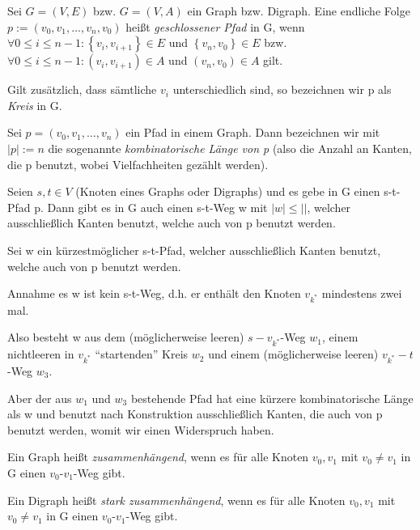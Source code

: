 \documentclass[10pt]{scrbook}
\begin{document}
\begin{Def}
Sei $G=(V, E)$ bzw. $G=(V, A)$ ein Graph bzw. Digraph. Eine endliche Folge $p:=\left(v_0, v_1, \ldots, v_n, v_0\right)$ heißt \emph{geschlossener Pfad} in G, wenn $\forall 0\leq i \leq n-1: \left\{v_i, v_{i+1}\right\}\in E$ und $\left\{v_n, v_0\right\}\in E$ bzw. $\forall 0\leq i \leq n-1:  \left(v_i, v_{i+1}\right)\in A$ und $\left(v_n, v_0\right)\in A$ gilt.

Gilt zusätzlich, dass sämtliche $v_i$ unterschiedlich sind, so bezeichnen wir p als \emph{Kreis} in G.
\end{Def}

\begin{Def}
Sei $p=\left(v_0, v_1, \ldots, v_n\right)$ ein Pfad in einem Graph. Dann bezeichnen wir mit $\left|p\right|:=n$ die sogenannte \emph{kombinatorische Länge von p} (also die Anzahl an Kanten, die p benutzt, wobei Vielfachheiten gezählt werden).
\end{Def}

\begin{Le}
Seien $s, t\in V$ (Knoten eines Graphs oder Digraphs) und es gebe in G einen s-t-Pfad p. Dann gibt es in G auch einen s-t-Weg w mit $\left|w\right|\leq \left|\right|$, welcher ausschließlich Kanten benutzt, welche auch von p benutzt werden.
\end{Le}
\begin{bew}
Sei w ein kürzestmöglicher s-t-Pfad, welcher ausschließlich Kanten benutzt, welche auch von p benutzt werden.

Annahme es w ist kein s-t-Weg, d.h. er enthält den Knoten $v_{k^*}$ mindestens zwei mal.

Also besteht w aus dem (möglicherweise leeren) $s-v_{k^*}$-Weg $w_1$, einem nichtleeren in $v_{k^*}$ "`startenden"' Kreis $w_2$ und einem (möglicherweise leeren) $v_{k^*}-t$-Weg $w_3$.

Aber der aus $w_1$ und $w_3$ bestehende Pfad hat eine kürzere kombinatorische Länge als w und benutzt nach Konstruktion ausschließlich Kanten, die auch von p benutzt werden, womit wir einen Widerspruch haben.
\end{bew}

\begin{Def}
Ein Graph heißt \emph{zusammenhängend}, wenn es für alle Knoten $v_0, v_1$ mit $v_0\neq v_1$ in G einen $v_0$-$v_1$-Weg gibt.
\end{Def}

\begin{Def}
Ein Digraph heißt \emph{stark zusammenhängend}, wenn es für alle Knoten $v_0, v_1$ mit $v_0\neq v_1$ in G einen $v_0$-$v_1$-Weg gibt.
\end{Def}
\end{document}
